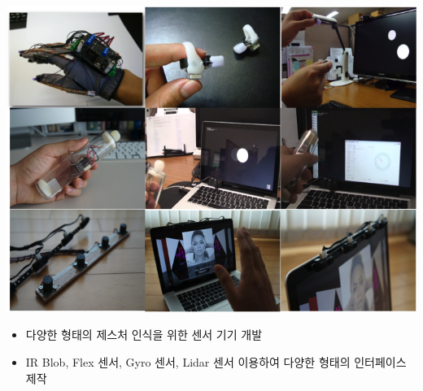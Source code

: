 \begin{cventries}
{\begin{cvitems}
{          \includegraphics[width=\linewidth]{resources/gesturedevices.png}
          \begin{itemize}
            \item {다양한 형태의 제스처 인식을 위한 센서 기기 개발}
            \item {IR Blob, Flex 센서, Gyro 센서, Lidar 센서 이용하여 다양한 형태의 인터페이스 제작}
          \end{itemize}
        }
      \end{cvitems}
    }
\end{cventries}
